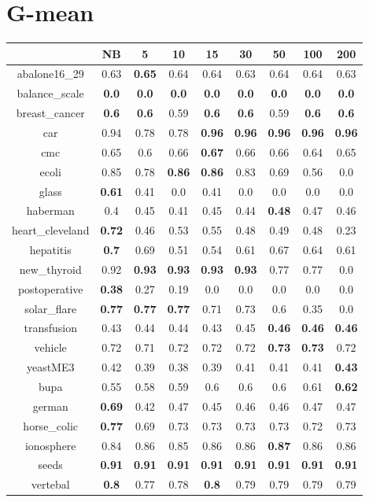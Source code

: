 \documentclass{article}%
\begin{document}
%
\section*{G{-}mean}%
\begin{tabular}{c|cccccccc}%
\hline%
&NB&5&10&15&30&50&100&200\\%
\hline%
abalone16\_29&0.63&\textbf{0.65}&0.64&0.64&0.63&0.64&0.64&0.63\\%
\hline%
balance\_scale&\textbf{0.0}&\textbf{0.0}&\textbf{0.0}&\textbf{0.0}&\textbf{0.0}&\textbf{0.0}&\textbf{0.0}&\textbf{0.0}\\%
\hline%
breast\_cancer&\textbf{0.6}&\textbf{0.6}&0.59&\textbf{0.6}&\textbf{0.6}&0.59&\textbf{0.6}&\textbf{0.6}\\%
\hline%
car&0.94&0.78&0.78&\textbf{0.96}&\textbf{0.96}&\textbf{0.96}&\textbf{0.96}&\textbf{0.96}\\%
\hline%
cmc&0.65&0.6&0.66&\textbf{0.67}&0.66&0.66&0.64&0.65\\%
\hline%
ecoli&0.85&0.78&\textbf{0.86}&\textbf{0.86}&0.83&0.69&0.56&0.0\\%
\hline%
glass&\textbf{0.61}&0.41&0.0&0.41&0.0&0.0&0.0&0.0\\%
\hline%
haberman&0.4&0.45&0.41&0.45&0.44&\textbf{0.48}&0.47&0.46\\%
\hline%
heart\_cleveland&\textbf{0.72}&0.46&0.53&0.55&0.48&0.49&0.48&0.23\\%
\hline%
hepatitis&\textbf{0.7}&0.69&0.51&0.54&0.61&0.67&0.64&0.61\\%
\hline%
new\_thyroid&0.92&\textbf{0.93}&\textbf{0.93}&\textbf{0.93}&\textbf{0.93}&0.77&0.77&0.0\\%
\hline%
postoperative&\textbf{0.38}&0.27&0.19&0.0&0.0&0.0&0.0&0.0\\%
\hline%
solar\_flare&\textbf{0.77}&\textbf{0.77}&\textbf{0.77}&0.71&0.73&0.6&0.35&0.0\\%
\hline%
transfusion&0.43&0.44&0.44&0.43&0.45&\textbf{0.46}&\textbf{0.46}&\textbf{0.46}\\%
\hline%
vehicle&0.72&0.71&0.72&0.72&0.72&\textbf{0.73}&\textbf{0.73}&0.72\\%
\hline%
yeastME3&0.42&0.39&0.38&0.39&0.41&0.41&0.41&\textbf{0.43}\\%
\hline%
bupa&0.55&0.58&0.59&0.6&0.6&0.6&0.61&\textbf{0.62}\\%
\hline%
german&\textbf{0.69}&0.42&0.47&0.45&0.46&0.46&0.47&0.47\\%
\hline%
horse\_colic&\textbf{0.77}&0.69&0.73&0.73&0.73&0.73&0.72&0.73\\%
\hline%
ionosphere&0.84&0.86&0.85&0.86&0.86&\textbf{0.87}&0.86&0.86\\%
\hline%
seeds&\textbf{0.91}&\textbf{0.91}&\textbf{0.91}&\textbf{0.91}&\textbf{0.91}&\textbf{0.91}&\textbf{0.91}&\textbf{0.91}\\%
\hline%
vertebal&\textbf{0.8}&0.77&0.78&\textbf{0.8}&0.79&0.79&0.79&0.79\\%
\hline%
\end{tabular}

%
\end{document}
